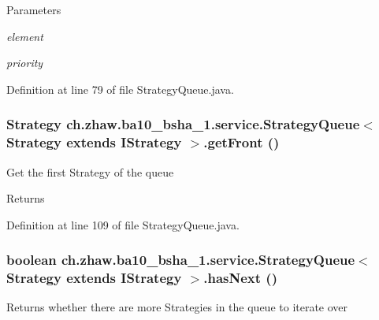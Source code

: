 \begin{DoxyParams}{Parameters}
\item[{\em element}]\item[{\em priority}]\end{DoxyParams}


Definition at line 79 of file StrategyQueue.java.\hypertarget{classch_1_1zhaw_1_1ba10__bsha__1_1_1service_1_1StrategyQueue_3_01Strategy_01extends_01IStrategy_01_4_a52f7573f550132117fdb03083b27e9f4}{
\subsubsection[{getFront}]{\setlength{\rightskip}{0pt plus 5cm}Strategy ch.zhaw.ba10\_\-bsha\_\-1.service.StrategyQueue$<$ Strategy extends {\bf IStrategy} $>$.getFront ()}}
\label{classch_1_1zhaw_1_1ba10__bsha__1_1_1service_1_1StrategyQueue_3_01Strategy_01extends_01IStrategy_01_4_a52f7573f550132117fdb03083b27e9f4}
Get the first Strategy of the queue

\begin{DoxyReturn}{Returns}

\end{DoxyReturn}


Definition at line 109 of file StrategyQueue.java.\hypertarget{classch_1_1zhaw_1_1ba10__bsha__1_1_1service_1_1StrategyQueue_3_01Strategy_01extends_01IStrategy_01_4_ad17a1d8ee0daf7fa8bf03ebcdf086e98}{
\subsubsection[{hasNext}]{\setlength{\rightskip}{0pt plus 5cm}boolean ch.zhaw.ba10\_\-bsha\_\-1.service.StrategyQueue$<$ Strategy extends {\bf IStrategy} $>$.hasNext ()}}
\label{classch_1_1zhaw_1_1ba10__bsha__1_1_1service_1_1StrategyQueue_3_01Strategy_01extends_01IStrategy_01_4_ad17a1d8ee0daf7fa8bf03ebcdf086e98}
Returns whether there are more Strategies in the queue to iterate over 

